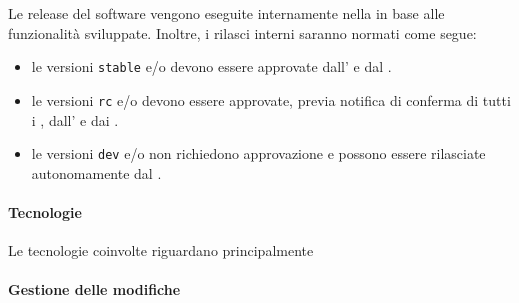 		Le release del software vengono eseguite internamente nella  in base alle funzionalità sviluppate. Inoltre, i rilasci interni saranno normati come segue:
		\begin{itemize}
			\item le versioni \verb!stable! e/o  devono essere approvate dall' e dal .
			\item le versioni \verb!rc! e/o  devono essere approvate, previa notifica di conferma di tutti i , dall' e dai .
			\item le versioni \verb!dev! e/o  non richiedono approvazione e possono essere rilasciate autonomamente dal .
		\end{itemize}


		\paragraph{Tecnologie}

		Le tecnologie coinvolte riguardano principalmente 

		\paragraph{Gestione delle modifiche}

	